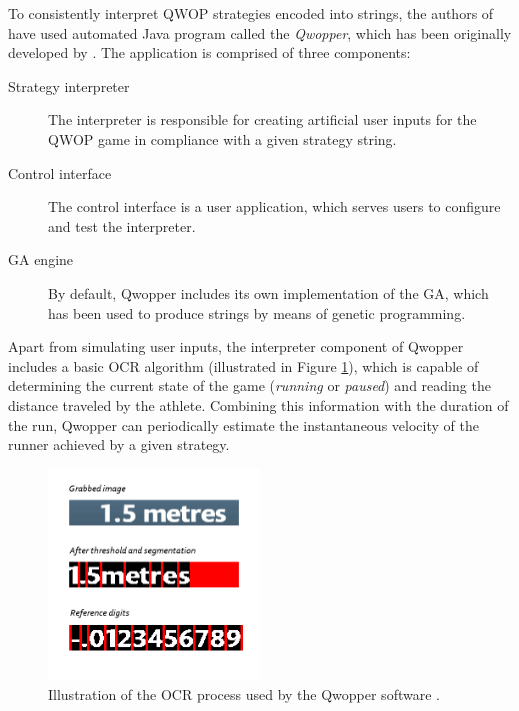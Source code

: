 To consistently interpret QWOP strategies encoded into strings, the authors of \cite{EvolvingQwopGaits} have used automated Java program called the \textit{Qwopper}, which has been originally developed by \cite{QwopEncoding}. The application is comprised of three components:
~
\begin{description}
	\item[Strategy interpreter]
	The interpreter is responsible for creating artificial user inputs for the QWOP game in compliance with a given strategy string.

	\item[Control interface]
	The control interface is a user application, which serves users to configure and test the interpreter.

	\item[GA engine]
	By default, Qwopper includes its own implementation of the GA, which has been used to produce strings by means of genetic programming.
\end{description}

Apart from simulating user inputs, the interpreter component of Qwopper includes a basic OCR algorithm (illustrated in Figure \ref{figure:QWOP-OCR}), which is capable of determining the current state of the game (\textit{running} or \textit{paused}) and reading the distance traveled by the athlete. Combining this information with the duration of the run, Qwopper can periodically estimate the instantaneous velocity of the runner achieved by a given strategy.

\begin{figure}[ht]
	\centering
	\includegraphics[width=0.5\textwidth]{img/reading_digits.png}
	\caption[OCR process used by the Qwopper software.]{Illustration of the OCR process used by the Qwopper software \cite{QwopEncoding}.}
	\label{figure:QWOP-OCR}
\end{figure}

